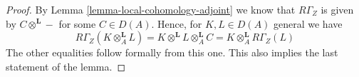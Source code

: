 \documentclass[10pt,a4paper]{amsart}
\theoremstyle{plain}
\theoremstyle{definition}
\theoremstyle{remark}
\numberwithin{equation}{subsection}
\begin{document}
\begin{proof}
By Lemma \ref{lemma-local-cohomology-adjoint} we know that
$R\Gamma_Z$ is given by $C \otimes^\mathbf{L} -$ for some $C \in D(A)$.
Hence, for $K, L \in D(A)$ general we have
$$
R\Gamma_Z(K \otimes_A^\mathbf{L} L) =
K \otimes^\mathbf{L} L \otimes_A^\mathbf{L} C =
K \otimes_A^\mathbf{L} R\Gamma_Z(L)
$$
The other equalities follow formally from this one. This also implies
the last statement of the lemma.
\end{proof}
\end{document}
